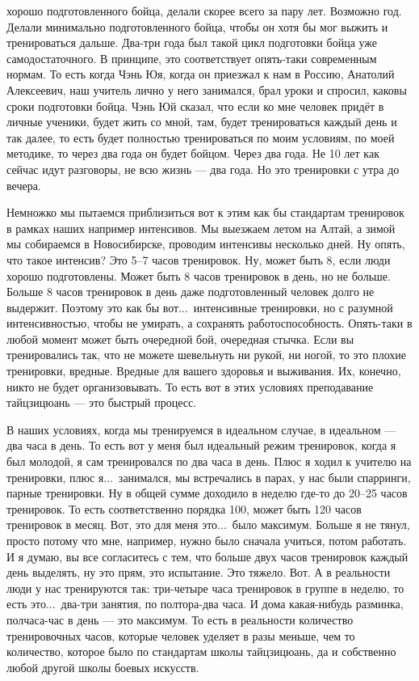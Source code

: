хорошо подготовленного бойца, делали скорее всего за 
пару лет.  Возможно год. Делали минимально 
подготовленного бойца, чтобы он хотя бы мог выжить и 
тренироваться дальше.  Два-три года был такой цикл 
подготовки бойца уже самодостаточного. В принципе,  
это соответствует опять-таки современным нормам. То 
есть когда Чэнь Юя, когда он приезжал к нам в Россию, 
Анатолий Алексеевич, наш учитель лично у него 
занимался, брал уроки и спросил, каковы сроки 
подготовки бойца. Чэнь Юй сказал, что если ко мне 
человек придёт в личные ученики, будет жить со мной, 
там, будет тренироваться каждый день и так далее, то 
есть будет полностью тренироваться по моим условиям, 
по моей методике, то через два года он будет бойцом. 
Через два года. Не 10 лет как сейчас идут разговоры, не 
всю жизнь --- два года. Но это тренировки с утра до вечера.

Немножко мы пытаемся приблизиться 
вот к этим как бы стандартам тренировок в рамках наших 
например интенсивов. Мы выезжаем летом на Алтай, а 
зимой мы собираемся в Новосибирске, проводим интенсивы 
несколько дней. Ну опять, что такое интенсив? Это 5--7 
часов тренировок. Ну, может быть 8, если люди хорошо 
подготовлены. Может быть 8 часов тренировок в день, но 
не больше. Больше 8 часов тренировок в день даже 
подготовленный человек долго не выдержит. Поэтому это 
как бы вот...\ интенсивные тренировки, но с разумной 
интенсивностью, чтобы не умирать, а сохранять 
работоспособность. Опять-таки в любой момент может 
быть очередной бой, очередная стычка. Если вы 
тренировались так, что не можете шевельнуть ни рукой, 
ни ногой, то это плохие тренировки, вредные. Вредные 
для вашего здоровья и выживания. Их, конечно, никто не 
будет организовывать.
То есть вот в этих условиях 
преподавание тайцзицюань --- это быстрый процесс.

В 
наших условиях, когда мы тренируемся в идеальном 
случае, в идеальном --- два часа в день. То есть вот у 
меня был идеальный режим тренировок, когда я был 
молодой, я сам тренировался по два часа в день. Плюс я 
ходил к учителю на тренировки, плюс я...\ занимался, мы 
встречались в парах, у нас были спарринги, парные 
тренировки. Ну в общей сумме доходило в неделю где-то 
до 20--25 часов тренировок. То есть соответственно 
порядка 100, может быть 120 часов тренировок в месяц. Вот, 
это для меня это...\ было максимум. Больше я не тянул, 
просто потому что мне, например, нужно было сначала 
учиться, потом работать. И я думаю, вы все согласитесь 
с тем, что больше двух часов тренировок каждый день 
выделять, ну это прям, это испытание. Это тяжело.  Вот. А 
в реальности люди у нас тренируются так: три-четыре 
часа тренировок в группе в неделю, то есть это...\ 
два-три занятия, по полтора-два часа. И дома 
какая-нибудь разминка, полчаса-час в день --- это 
максимум. То есть в реальности количество 
тренировочных часов,  которые человек уделяет в разы 
меньше, чем то количество, которое было по стандартам школы 
тайцзицюань, да и собственно любой другой школы боевых 
искусств.

